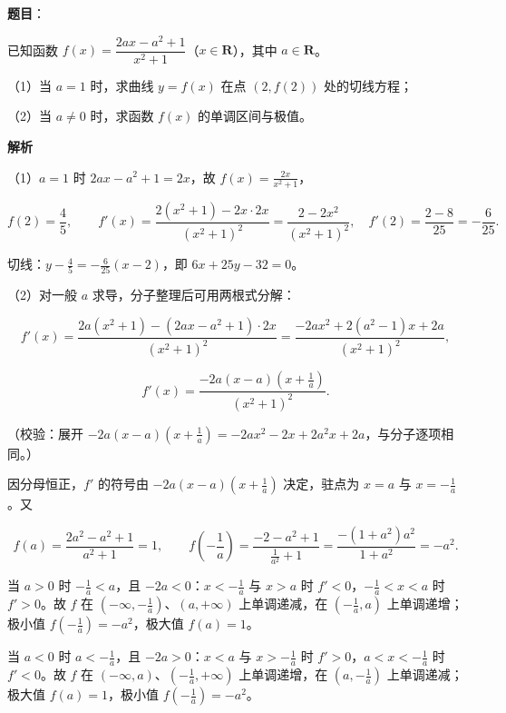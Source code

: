 \begin{answer}

\textbf{题目}：

已知函数 $f(x)=\dfrac{2ax-a^2+1}{x^2+1}$（$x\in\mathbf{R}$），其中 $a\in\mathbf{R}$。

（1）当 $a=1$ 时，求曲线 $y=f(x)$ 在点 $(2,f(2))$ 处的切线方程；

（2）当 $a\neq 0$ 时，求函数 $f(x)$ 的单调区间与极值。

\textbf{解析}

（1）$a=1$ 时 $2ax-a^2+1=2x$，故 $f(x)=\frac{2x}{x^2+1}$，

\nopagebreak[4]
\[f(2)=\frac45,\qquad f'(x)=\frac{2\left(x^2+1\right)-2x\cdot2x}{\left(x^2+1\right)^2}=\frac{2-2x^2}{\left(x^2+1\right)^2},\quad f'(2)=\frac{2-8}{25}=-\frac6{25}.\]

切线：$y-\frac45=-\frac6{25}(x-2)$，即 $6x+25y-32=0$。

（2）对一般 $a$ 求导，分子整理后可用两根式分解：

\nopagebreak[4]
\[f'(x)=\frac{2a\left(x^2+1\right)-\left(2ax-a^2+1\right)\cdot2x}{\left(x^2+1\right)^2}=\frac{-2ax^2+2\left(a^2-1\right)x+2a}{\left(x^2+1\right)^2},\]

\nopagebreak[4]
\[f'(x)=\frac{-2a\left(x-a\right)\left(x+\frac1a\right)}{\left(x^2+1\right)^2}.\]

（校验：展开 $-2a\left(x-a\right)\left(x+\frac1a\right)=-2ax^2-2x+2a^2x+2a$，与分子逐项相同。）

因分母恒正，$f'$ 的符号由 $-2a\left(x-a\right)\left(x+\frac1a\right)$ 决定，驻点为 $x=a$ 与 $x=-\frac1a$。又

\nopagebreak[4]
\[f(a)=\frac{2a^2-a^2+1}{a^2+1}=1,\qquad f\left(-\frac1a\right)=\frac{-2-a^2+1}{\frac1{a^2}+1}=\frac{-\left(1+a^2\right)a^2}{1+a^2}=-a^2 .\]

当 $a>0$ 时 $-\frac1a<a$，且 $-2a<0$：$x<-\frac1a$ 与 $x>a$ 时 $f'<0$，$-\frac1a<x<a$ 时 $f'>0$。故 $f$ 在 $\left(-\infty,-\frac1a\right)$、$(a,+\infty)$ 上单调递减，在 $\left(-\frac1a,a\right)$ 上单调递增；极小值 $f\left(-\frac1a\right)=-a^2$，极大值 $f(a)=1$。

当 $a<0$ 时 $a<-\frac1a$，且 $-2a>0$：$x<a$ 与 $x>-\frac1a$ 时 $f'>0$，$a<x<-\frac1a$ 时 $f'<0$。故 $f$ 在 $(-\infty,a)$、$\left(-\frac1a,+\infty\right)$ 上单调递增，在 $\left(a,-\frac1a\right)$ 上单调递减；极大值 $f(a)=1$，极小值 $f\left(-\frac1a\right)=-a^2$。


\end{answer}
